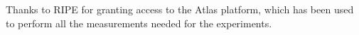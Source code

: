 \documentclass[acmsmall]{acmart}
\begin{document}
\begin{acks}
Thanks to RIPE for granting access to the Atlas platform, which has been used to perform all the measurements needed for the experiments.
\end{acks}





\appendix
\end{document}
